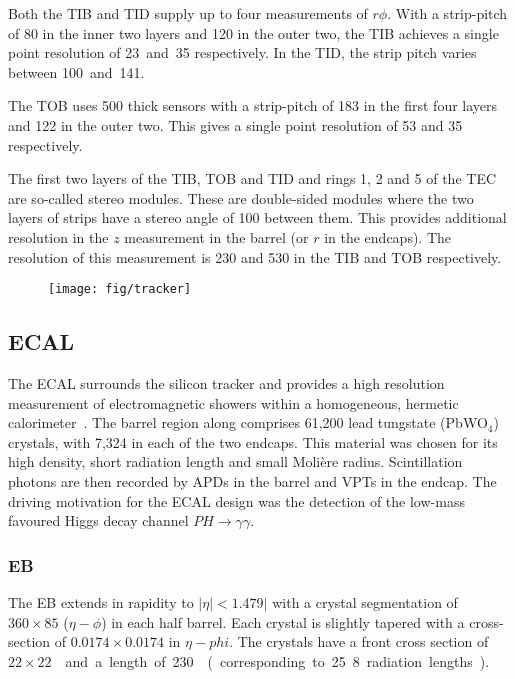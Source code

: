 Both the \ac{TIB} and \ac{TID} supply up to four measurements of $r\phi$. With a
strip-pitch of \unit{80}{\micro\metre} in the inner two layers and
\unit{120}{\micro\metre} in the outer two, the \ac{TIB} achieves a single point
resolution of \unit{23 and 35}{\micro\metre} respectively. In the \ac{TID}, the
strip pitch varies between \unit{100 and 141}{\micro\metre}.

The \ac{TOB} uses \unit{500}{\micro\metre} thick sensors with a strip-pitch of
\unit{183}{\micro\metre} in the first four layers and \unit{122}{\micro\metre} in
the outer two. This gives a single point resolution of \unit{53}{\micro\metre}
and \unit{35}{\micro\metre} respectively.

The first two layers of the \ac{TIB}, \ac{TOB} and \ac{TID} and rings 1, 2 and 5
of the \ac{TEC} are so-called stereo modules. These are double-sided modules
where the two layers of strips have a stereo angle of \unit{100}{\milli\radian}
between them. This provides additional resolution in the $z$ measurement in the
barrel (or $r$ in the endcaps). The resolution of this measurement is
\unit{230}{\micro\metre} and \unit{530}{\micro\metre} in the \ac{TIB} and
\ac{TOB} respectively.

\begin{figure}
\texttt{[image: fig/tracker]}
\end{figure}

\subsection{\acl{ECAL}}
The \ac{ECAL} surrounds the silicon tracker and provides a high resolution
measurement of electromagnetic showers within a homogeneous, hermetic
calorimeter~\cite{ecal_paper}. The barrel region along comprises 61,200 lead
tungstate (PbWO$_4$) crystals, with 7,324 in each of the two endcaps. This
material was chosen for its high density, short radiation length and small
Moli\`{e}re radius. Scintillation photons are then recorded by \ac{APD}s in the
barrel and \ac{VPT}s in the endcap. The driving motivation for the \ac{ECAL}
design was the detection of the low-mass favoured Higgs decay channel
$PH\longrightarrow\gamma\gamma$.

\subsubsection{\acl{EB}}
The \ac{EB} extends in rapidity to $|\eta|<1.479|$ with a crystal
segmentation of $360\times 85$ ($\eta-\phi$) in each half barrel. Each crystal
is slightly tapered with a cross-section of $0.0174\times0.0174$ in
$\eta-phi$. The crystals have a front cross section of \unit{$22\times
  22$}{\milli\metre\squared} and a length of \unit{230}{\milli\metre}
(corresponding to 25.8 radiation lengths).

